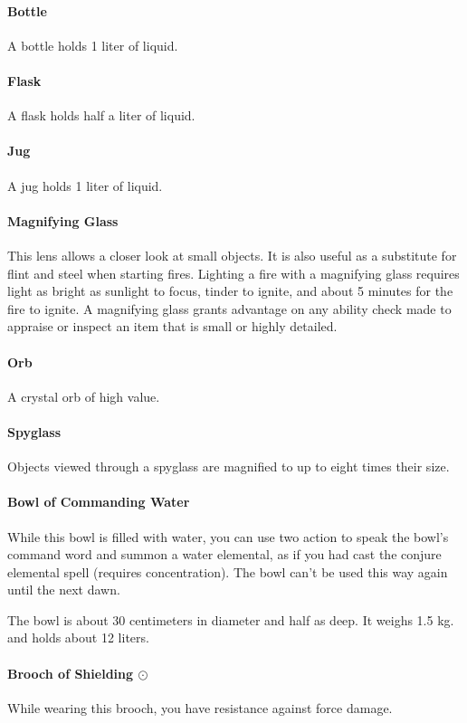 \paragraph{Bottle}
    A bottle holds 1 liter of liquid.
\paragraph{Flask}
    A flask holds half a liter of liquid.
\paragraph{Jug}
    A jug holds 1 liter of liquid.
\paragraph{Magnifying Glass}
    This lens allows a closer look at small objects.
    It is also useful as a substitute for flint and steel when starting fires.
    Lighting a fire with a magnifying glass requires light as bright as sunlight to focus, tinder to ignite, and about 5 minutes for the fire to ignite.
    A magnifying glass grants advantage on any ability check made to appraise or inspect an item that is small or highly detailed.
\paragraph{Orb}
    A crystal orb of high value.
\paragraph{Spyglass}
    Objects viewed through a spyglass are magnified to up to eight times their size.

\paragraph{Bowl of Commanding Water}
    While this bowl is filled with water, you can use two action to speak the bowl's command word and summon a water elemental, as if you had cast the conjure elemental spell (requires concentration).
    The bowl can't be used this way again until the next dawn.

    The bowl is about 30 centimeters in diameter and half as deep.
    It weighs 1.5 kg. and holds about 12 liters.
\paragraph{Brooch of Shielding $\odot$}
    While wearing this brooch, you have resistance against force damage.

